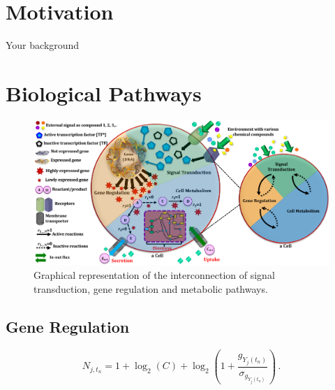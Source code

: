 \documentclass[print,phd]{nuthesis}
\begin{document}
\section{Motivation}
\label{sec:motivation}
\par Your background

\section{Biological Pathways}
\label{sec:biologicalpathways}

\par 
\begin{figure} [h]
	\begin{center}
		\centering
		\includegraphics[width=\linewidth]{figures/E2E_model.pdf}
		\caption{Graphical representation of the interconnection of signal transduction, gene regulation and metabolic pathways.}
		\label{fig:biologicalpathways_1}
	\end{center}
\end{figure}

\subsection{Gene Regulation}
\label{subsec:generegulation}

\begin{equation} \label{eqn:doane_formula}
N_{j,t_n} = 1 + \log_2 (C) + \log_2 \left( 1+\frac{g_{Y_j(t_n)}}{\sigma_{g_{Y_j(t_n)}}} \right) \, .
\end{equation}
\end{document}
